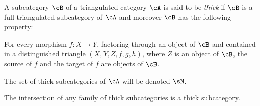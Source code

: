 \begin{definition}\label{VIII:2-1-1}
A subcategory $\cB$ of a triangulated category $\cA$ is said to be
\emph{thick} if $\cB$ is a full triangulated subcategory of $\cA$
and moreover $\cB$ has the following property:

For every morphism $f:X\to Y$, factoring through an object of $\cB$ and contained
in a distinguished triangle $(X,Y,Z,f,g,h)$, where $Z$ is an object of $\cB$,
the source of $f$ and the target of $f$ are objects of $\cB$.
\end{definition}

The set of thick subcategories of $\cA$ will be denoted $\sN$.

The intersection of any family of thick subcategories is
a thick subcategory. 





